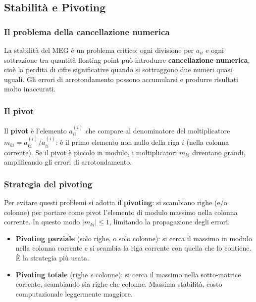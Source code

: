 \documentclass[a4paper,12pt]{article}
\theoremstyle{definition}
\theoremstyle{remark}
\begin{document}
\subsection{Stabilità e Pivoting}

\subsubsection*{Il problema della cancellazione numerica}

La stabilità del MEG è un problema critico: ogni divisione per $a_{ii}$
e ogni sottrazione tra quantità floating point può introdurre
\textbf{cancellazione numerica}, cioè la perdita di cifre significative
quando si sottraggono due numeri quasi uguali. Gli errori di arrotondamento
possono accumularsi e produrre risultati molto inaccurati.

\subsubsection*{Il pivot}

Il \textbf{pivot} è l'elemento $a_{ii}^{(i)}$ che compare al denominatore
del moltiplicatore $m_{ki} = a_{ki}^{(i)}/a_{ii}^{(i)}$: è il primo elemento
non nullo della riga $i$ (nella colonna corrente). Se il pivot è piccolo
in modulo, i moltiplicatori $m_{ki}$ diventano grandi, amplificando gli
errori di arrotondamento.

\subsubsection*{Strategia del pivoting}

Per evitare questi problemi si adotta il \textbf{pivoting}: si scambiano
righe (e/o colonne) per portare come pivot l'elemento di modulo massimo
nella colonna corrente. In questo modo $|m_{ki}| \le 1$, limitando la
propagazione degli errori.

\begin{itemize}
  \item \textbf{Pivoting parziale} (solo righe, o solo colonne): si cerca
        il massimo in modulo nella colonna corrente e si scambia la riga
        corrente con quella che lo contiene. È la strategia più usata.
  \item \textbf{Pivoting totale} (righe \emph{e} colonne): si cerca il
        massimo nella sotto-matrice corrente, scambiando sia righe che colonne.
        Massima stabilità, costo computazionale leggermente maggiore.
\end{itemize}
\end{document}
